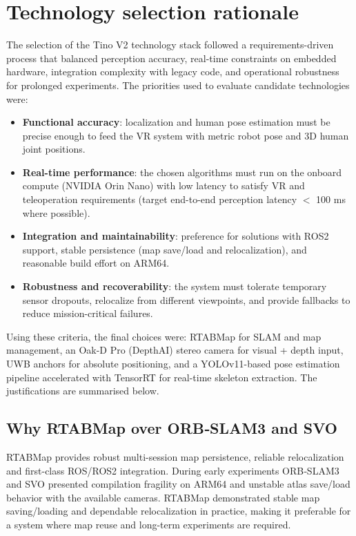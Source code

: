 \section{Technology selection rationale}

The selection of the Tino V2 technology stack followed a requirements-driven process that balanced perception accuracy, real-time constraints on embedded hardware, integration complexity with legacy code, and operational robustness for prolonged experiments. The priorities used to evaluate candidate technologies were:

\begin{itemize}
	\item \textbf{Functional accuracy}: localization and human pose estimation must be precise enough to feed the VR system with metric robot pose and 3D human joint positions.
	\item \textbf{Real-time performance}: the chosen algorithms must run on the onboard compute (NVIDIA Orin Nano) with low latency to satisfy VR and teleoperation requirements (target end-to-end perception latency $<$ 100 ms where possible).
	\item \textbf{Integration and maintainability}: preference for solutions with ROS2 support, stable persistence (map save/load and relocalization), and reasonable build effort on ARM64.
	\item \textbf{Robustness and recoverability}: the system must tolerate temporary sensor dropouts, relocalize from different viewpoints, and provide fallbacks to reduce mission-critical failures.
\end{itemize}

Using these criteria, the final choices were: RTABMap for SLAM and map management, an Oak-D Pro (DepthAI) stereo camera for visual + depth input, UWB anchors for absolute positioning, and a YOLOv11-based pose estimation pipeline accelerated with TensorRT for real-time skeleton extraction. The justifications are summarised below.

\subsection*{Why RTABMap over ORB‑SLAM3 and SVO}
RTABMap provides robust multi-session map persistence, reliable relocalization and first-class ROS/ROS2 integration. During early experiments ORB‑SLAM3 and SVO presented compilation fragility on ARM64 and unstable atlas save/load behavior with the available cameras. RTABMap demonstrated stable map saving/loading and dependable relocalization in practice, making it preferable for a system where map reuse and long-term experiments are required.

